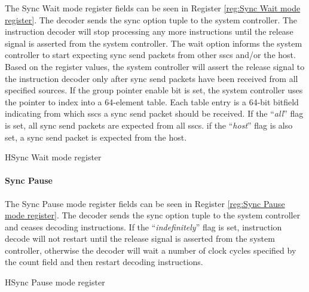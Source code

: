 The Sync Wait mode register fields can be seen in Register \ref{reg:Sync Wait mode register}.
The decoder sends the sync option tuple to the system controller.
The instruction decoder will stop processing any more instructions until the release signal is asserted from the system controller.
The wait option informs the system controller to start expecting sync send packets from other \acp{ssc} and/or the host.
Based on the register values, the system controller will assert the release signal to the instruction decoder only after sync send packets have been received from all specified sources.
If the group pointer enable bit is set, the system controller uses the pointer to index into a 64-element table. 
Each table entry is a 64-bit bitfield indicating from which \acp{ssc} a sync send packet should be received.
If the ``{\textit{all}}'' flag is set, all sync send packets are expected from all \acp{ssc}.
if the ``{\textit{host}}'' flag is also set, a sync send packet is expected from the host.
\begin{register}{H}{Sync Wait mode register}{}%
  \label{reg:Sync Wait mode register}
  \vspace{-20pt}
\end{register}


\paragraph{Sync Pause}

The Sync Pause mode register fields can be seen in Register \ref{reg:Sync Pause mode register}.
The decoder sends the sync option tuple to the system controller and ceases decoding instructions.
If the ``{\textit{indefinitely}}'' flag is set, instruction decode will not restart until the release signal is asserted from the system controller, otherwise the decoder will wait a number of clock cycles specified by the count field and then restart decoding instructions.
\begin{register}{H}{Sync Pause mode register}{}%
  \label{reg:Sync Pause mode register}
  \vspace{-10pt}
\end{register}

